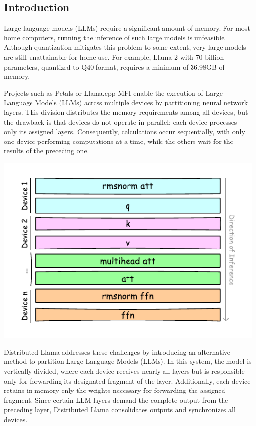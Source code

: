 \documentclass{article}
\newenvironment{Figure}
  {\par\medskip\noindent\minipage{\linewidth}}
  {\endminipage\par\medskip}
\begin{document}
\begin{multicols}{2}

\section{Introduction}

Large language models (LLMs) require a significant amount of memory. For most home computers, running the inference of such large models is unfeasible. Although quantization mitigates this problem to some extent, very large models are still unattainable for home use. For example, Llama 2 \cite{llama2}  with 70 billion parameters, quantized to Q40 format, requires a minimum of 36.98GB of memory.

Projects such as Petals \cite{borzunov2022petals} or Llama.cpp MPI \cite{llamacpp} enable the execution of Large Language Models (LLMs) across multiple devices by partitioning neural network layers. This division distributes the memory requirements among all devices, but the drawback is that devices do not operate in parallel; each device processes only its assigned layers. Consequently, calculations occur sequentially, with only one device performing computations at a time, while the others wait for the results of the preceding one.

\begin{Figure}
  \centering
  \includegraphics[width=\linewidth]{fig1.pdf}
\end{Figure}

Distributed Llama addresses these challenges by introducing an alternative method to partition Large Language Models (LLMs). In this system, the model is vertically divided, where each device receives nearly all layers but is responsible only for forwarding its designated fragment of the layer. Additionally, each device retains in memory only the weights necessary for forwarding the assigned fragment. Since certain LLM layers demand the complete output from the preceding layer, Distributed Llama consolidates outputs and synchronizes all devices.


\end{multicols}
\end{document}
